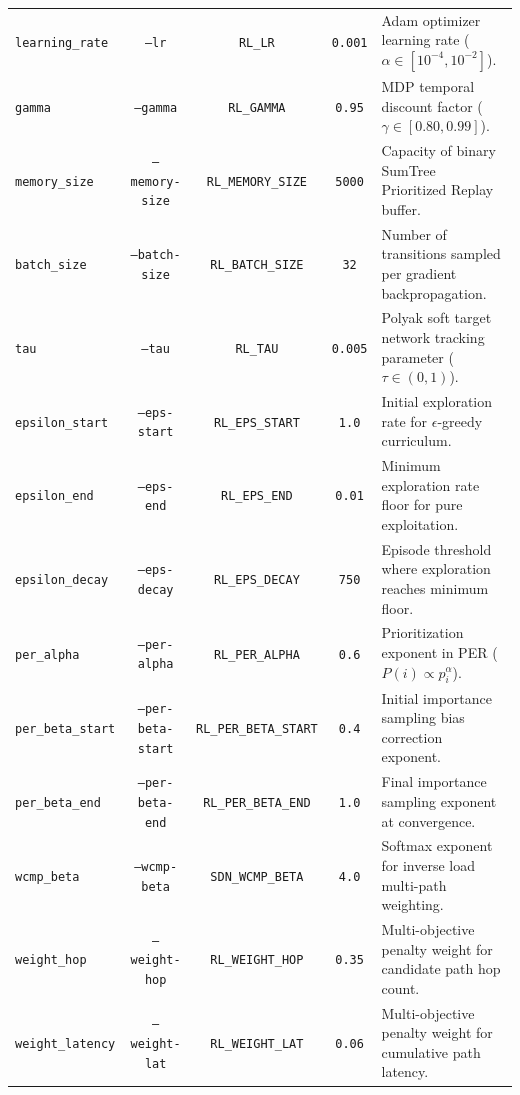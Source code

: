 \documentclass[12pt,a4paper,oneside]{report}
\begin{document}
\begin{table}[htbp]
\begin{tabularx}{\textwidth}{l c c c X}
\texttt{learning\_rate} & \texttt{--lr} & \texttt{RL\_LR} & \texttt{0.001} & Adam optimizer learning rate ($\alpha \in [10^{-4}, 10^{-2}]$). \\
\texttt{gamma} & \texttt{--gamma} & \texttt{RL\_GAMMA} & \texttt{0.95} & MDP temporal discount factor ($\gamma \in [0.80, 0.99]$). \\
\texttt{memory\_size} & \texttt{--memory-size} & \texttt{RL\_MEMORY\_SIZE} & \texttt{5000} & Capacity of binary SumTree Prioritized Replay buffer. \\
\texttt{batch\_size} & \texttt{--batch-size} & \texttt{RL\_BATCH\_SIZE} & \texttt{32} & Number of transitions sampled per gradient backpropagation. \\
\texttt{tau} & \texttt{--tau} & \texttt{RL\_TAU} & \texttt{0.005} & Polyak soft target network tracking parameter ($\tau \in (0, 1)$). \\
\texttt{epsilon\_start} & \texttt{--eps-start} & \texttt{RL\_EPS\_START} & \texttt{1.0} & Initial exploration rate for $\epsilon$-greedy curriculum. \\
\texttt{epsilon\_end} & \texttt{--eps-end} & \texttt{RL\_EPS\_END} & \texttt{0.01} & Minimum exploration rate floor for pure exploitation. \\
\texttt{epsilon\_decay} & \texttt{--eps-decay} & \texttt{RL\_EPS\_DECAY} & \texttt{750} & Episode threshold where exploration reaches minimum floor. \\
\texttt{per\_alpha} & \texttt{--per-alpha} & \texttt{RL\_PER\_ALPHA} & \texttt{0.6} & Prioritization exponent in PER ($P(i) \propto p_i^\alpha$). \\
\texttt{per\_beta\_start} & \texttt{--per-beta-start} & \texttt{RL\_PER\_BETA\_START} & \texttt{0.4} & Initial importance sampling bias correction exponent. \\
\texttt{per\_beta\_end} & \texttt{--per-beta-end} & \texttt{RL\_PER\_BETA\_END} & \texttt{1.0} & Final importance sampling exponent at convergence. \\
\addlinespace
\texttt{wcmp\_beta} & \texttt{--wcmp-beta} & \texttt{SDN\_WCMP\_BETA} & \texttt{4.0} & Softmax exponent for inverse load multi-path weighting. \\
\texttt{weight\_hop} & \texttt{--weight-hop} & \texttt{RL\_WEIGHT\_HOP} & \texttt{0.35} & Multi-objective penalty weight for candidate path hop count. \\
\texttt{weight\_latency} & \texttt{--weight-lat} & \texttt{RL\_WEIGHT\_LAT} & \texttt{0.06} & Multi-objective penalty weight for cumulative path latency. \\

\end{tabularx}
\end{table}
\end{document}
